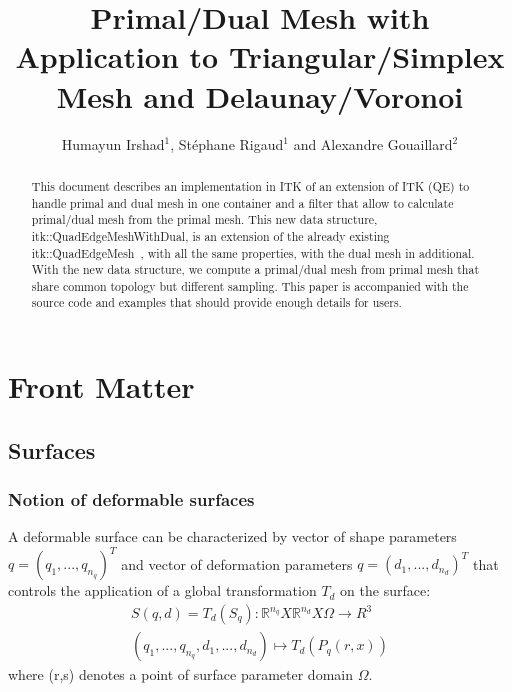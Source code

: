 \documentclass{InsightArticle}
\title{Primal/Dual Mesh with Application to Triangular/Simplex Mesh and Delaunay/Voronoi}
\author{Humayun Irshad$^{1}$, St\'{e}phane Rigaud$^{1}$ and Alexandre Gouaillard$^{2}$}
\newcommand{\IJhandlerIDnumber}{1338} %
\begin{document}
%
% 
\IJhandlefooter{\IJhandlerIDnumber}


\ifpdf
\else
\fi


\maketitle


\ifhtml
\chapter*{Front Matter\label{front}}
\fi


\begin{abstract}
\noindent
This document describes an implementation in ITK of an extension of ITK (QE) to handle primal and dual mesh in one container and a filter that allow to calculate primal/dual mesh from the primal mesh. This new data structure, itk::QuadEdgeMeshWithDual, is an extension of the already existing itk::QuadEdgeMesh~\cite{Gouaillard2006}, with all the same properties, with the dual mesh in additional. With the new data structure, we compute a primal/dual mesh from primal mesh that share common topology but different sampling. This paper is accompanied with the source code and examples that should provide enough details for users.
\end{abstract}
\IJhandlenote{\IJhandlerIDnumber}
\tableofcontents
\section{Surfaces}
\subsection{Notion of deformable surfaces}
A deformable surface can be characterized by vector of shape parameters $q = ( q_1, ... , q_{n_q})^T$ and vector of deformation parameters $q = ( d_1, ... , d_{n_d})^T$ that controls the application of a global transformation $T_d$ 
on the surface:
\begin{equation}
\begin{split}
	S(q,d) = T_d(S_q) : \mathbb{R}^{n_q} X \mathbb{R}^{n_d} X \Omega \longrightarrow R^3 \\	
	(q_1, ... , q_{n_q}, d_1, ... , d_{n_d} ) \longmapsto T_d(P_q(r,x))	\end{split}
\end{equation}
where (r,s) denotes a point of surface parameter domain $\Omega$.
\end{document}
